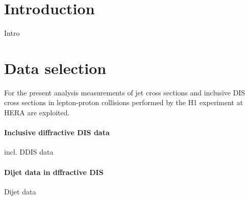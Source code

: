 \documentclass[12pt]{article}
\begin{document}
\clearpage

\pagestyle{plain} %


\section{Introduction}
Intro



\section{Data selection}
For the present analysis measurements of jet cross sections and inclusive DIS cross sections in
lepton-proton collisions performed by the H1 experiment at HERA are exploited.

\paragraph{Inclusive diffractive DIS data}
incl. DDIS data

\paragraph{Dijet data in dffractive DIS}
Dijet data
\end{document}
